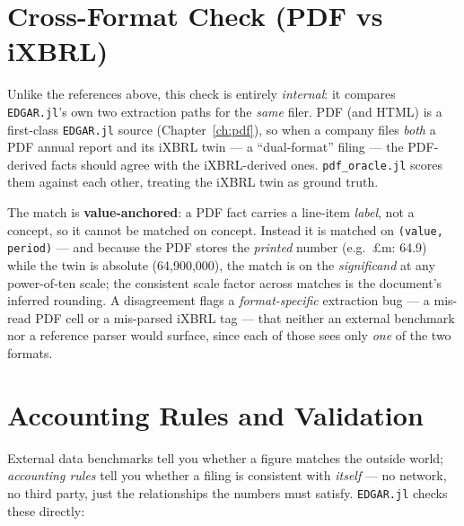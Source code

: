 \documentclass[11pt,a4paper]{report}
\begin{document}
\section{Cross-Format Check (PDF vs iXBRL)}
\label{sec:validation-crossformat}

Unlike the references above, this check is entirely \emph{internal}: it compares \texttt{EDGAR.jl}'s own two
extraction paths for the \emph{same} filer. PDF (and HTML) is a first-class \texttt{EDGAR.jl} source
(Chapter~\ref{ch:pdf}), so when a company files \emph{both} a PDF annual report and its iXBRL twin --- a
``dual-format'' filing --- the PDF-derived facts should agree with the iXBRL-derived ones.
\texttt{pdf\_oracle.jl} scores them against each other, treating the iXBRL twin as ground truth.

The match is \textbf{value-anchored}: a PDF fact carries a line-item \emph{label}, not a concept, so it
cannot be matched on concept. Instead it is matched on \texttt{(value, period)} --- and because the PDF
stores the \emph{printed} number (e.g.\ £m: 64.9) while the twin is absolute (64{,}900{,}000), the match is
on the \emph{significand} at any power-of-ten scale; the consistent scale factor across matches is the
document's inferred rounding. A disagreement flags a \emph{format-specific} extraction bug --- a mis-read PDF
cell or a mis-parsed iXBRL tag --- that neither an external benchmark nor a reference parser would surface, since
each of those sees only \emph{one} of the two formats.

\section{Accounting Rules and Validation}
\label{sec:validation-rules}

External data benchmarks tell you whether a figure matches the outside world; \emph{accounting rules} tell
you whether a filing is consistent with \emph{itself} --- no network, no third party, just the relationships
the numbers must satisfy. \texttt{EDGAR.jl} checks these directly:
\end{document}
